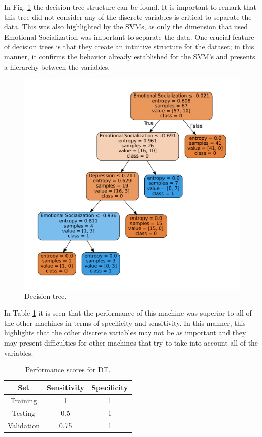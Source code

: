 In Fig. \ref{fig:dt} the decision tree structure can be found. It is important
to remark that this tree did not consider any of the discrete variables is
critical to separate the data. This was also highlighted by the SVMs, as only
the dimension that used Emotional Socialization was important to separate the
data. One crucial feature of decision trees is that they create an intuitive
structure for the dataset; in this manner, it confirms the behavior already
established for the SVM's and presents a hierarchy between the variables.

\begin{figure}
  \includegraphics[width=\columnwidth]{figs/tree-graph.pdf}
  \caption{Decision tree.}
  \label{fig:dt}
\end{figure}

In Table \ref{tab:DT} it is seen that the performance of this machine was
superior to all of the other machines in terms of specificity and sensitivity.
In this manner, this highlights that the other discrete variables may not be as
important and they may present difficulties for other machines that try to take
into account all of the variables.

\begin{table}
  \centering
  \caption{Performance scores for DT.}
  \label{tab:DT}
  \begin{tabular}{ccc}
    \hline
    \textbf{Set} & \multicolumn{1}{c}{\textbf{Sensitivity}} & \multicolumn{1}{c}{\textbf{Specificity}} \\ \hline
    Training & 1 & 1 \\
    Testing & 0.5 & 1 \\
    Validation & 0.75 & 1 \\ \hline
  \end{tabular}
\end{table}

